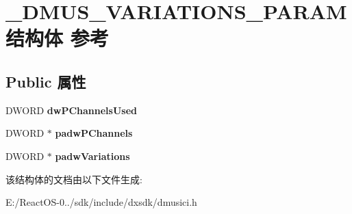 \hypertarget{struct___d_m_u_s___v_a_r_i_a_t_i_o_n_s___p_a_r_a_m}{}\section{\+\_\+\+D\+M\+U\+S\+\_\+\+V\+A\+R\+I\+A\+T\+I\+O\+N\+S\+\_\+\+P\+A\+R\+A\+M结构体 参考}
\label{struct___d_m_u_s___v_a_r_i_a_t_i_o_n_s___p_a_r_a_m}
\subsection*{Public 属性}
\begin{DoxyCompactItemize}
\item 
\mbox{\label{struct___d_m_u_s___v_a_r_i_a_t_i_o_n_s___p_a_r_a_m_ad5b5c801f4a1b38e2c27b3e8b613cfff}} 
D\+W\+O\+RD {\bfseries dw\+P\+Channels\+Used}
\item 
\mbox{\label{struct___d_m_u_s___v_a_r_i_a_t_i_o_n_s___p_a_r_a_m_ad9f9e6f0682629200c6dbe76be246c8e}} 
D\+W\+O\+RD $\ast$ {\bfseries padw\+P\+Channels}
\item 
\mbox{\label{struct___d_m_u_s___v_a_r_i_a_t_i_o_n_s___p_a_r_a_m_a02a3fa1d55e560cdac77055a3f100d6a}} 
D\+W\+O\+RD $\ast$ {\bfseries padw\+Variations}
\end{DoxyCompactItemize}


该结构体的文档由以下文件生成\+:\begin{DoxyCompactItemize}
\item 
E\+:/\+React\+O\+S-\/0../sdk/include/dxsdk/dmusici.\+h\end{DoxyCompactItemize}
